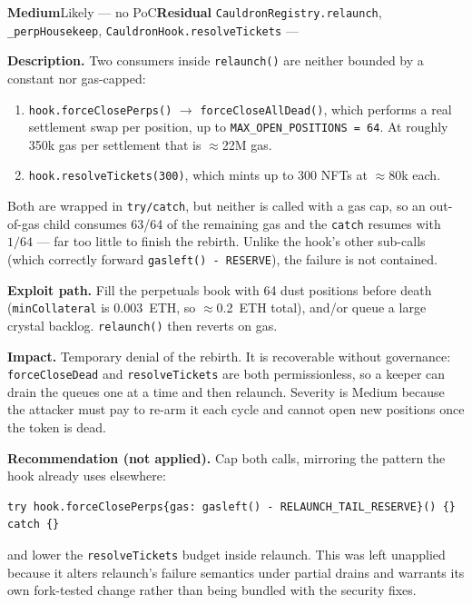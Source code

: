 \documentclass[10pt,a4paper]{article}
\newcommand{\sev}[2]{\textcolor{#1}{\textbf{#2}}}
\newcommand{\SevMed}{\sev{med}{Medium}}
\newcommand{\Residual}{\textcolor{med}{\textbf{Residual}}}
\newcommand{\code}[1]{\texttt{\small #1}}
\begin{document}
\finding{Z-07 --- \code{relaunch()} gas is unbounded in practice}
{\SevMed}{Likely --- no PoC}{\Residual}
{\code{CauldronRegistry.relaunch}, \code{\_perpHousekeep}, \code{CauldronHook.resolveTickets}}
{---}

\textbf{Description.} Two consumers inside \code{relaunch()} are neither bounded by a
constant nor gas-capped:

\begin{enumerate}[leftmargin=1.5em]
\item \code{hook.forceClosePerps()} $\to$ \code{forceCloseAllDead()}, which performs a real
settlement swap per position, up to \code{MAX\_OPEN\_POSITIONS = 64}. At roughly 350k gas
per settlement that is $\approx$22M gas.
\item \code{hook.resolveTickets(300)}, which mints up to 300 NFTs at $\approx$80k each.
\end{enumerate}

Both are wrapped in \code{try/catch}, but neither is called with a gas cap, so an
out-of-gas child consumes 63/64 of the remaining gas and the \code{catch} resumes with
$1/64$ --- far too little to finish the rebirth. Unlike the hook's other sub-calls (which
correctly forward \code{gasleft() - RESERVE}), the failure is not contained.

\textbf{Exploit path.} Fill the perpetuals book with 64 dust positions before death
(\code{minCollateral} is 0.003~ETH, so $\approx$0.2~ETH total), and/or queue a large
crystal backlog. \code{relaunch()} then reverts on gas.

\textbf{Impact.} Temporary denial of the rebirth. It is recoverable without governance:
\code{forceCloseDead} and \code{resolveTickets} are both permissionless, so a keeper can
drain the queues one at a time and then relaunch. Severity is Medium because the attacker
must pay to re-arm it each cycle and cannot open new positions once the token is dead.

\textbf{Recommendation (not applied).} Cap both calls, mirroring the pattern the hook
already uses elsewhere:
\begin{lstlisting}
try hook.forceClosePerps{gas: gasleft() - RELAUNCH_TAIL_RESERVE}() {} catch {}
\end{lstlisting}
and lower the \code{resolveTickets} budget inside relaunch. This was left unapplied because
it alters relaunch's failure semantics under partial drains and warrants its own
fork-tested change rather than being bundled with the security fixes.
\end{document}
